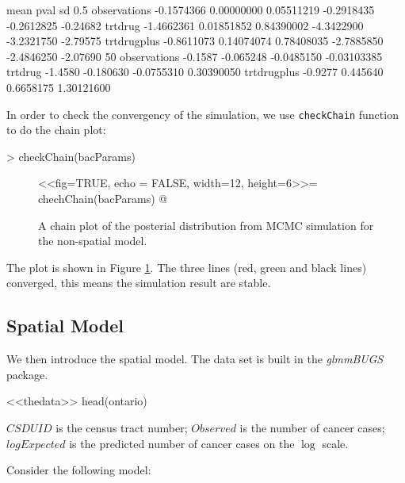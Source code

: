 \documentclass{article}
\begin{document}
\begin{Schunk}
\begin{Soutput}
                   mean       pval         sd       0.5%       2.5%       5%
observations -0.1574366 0.00000000 0.05511219 -0.2918435 -0.2612825 -0.24682
trtdrug      -1.4662361 0.01851852 0.84390002 -4.3422900 -3.2321750 -2.79575
trtdrugplus  -0.8611073 0.14074074 0.78408035 -2.7885850 -2.4846250 -2.07690
                 50%       95%      97.5%       99.5%
observations -0.1587 -0.065248 -0.0485150 -0.03103385
trtdrug      -1.4580 -0.180630 -0.0755310  0.30390050
trtdrugplus  -0.9277  0.445640  0.6658175  1.30121600
\end{Soutput}
\end{Schunk}

In order to check the convergency of the simulation, we use \verb!checkChain! function to do the chain plot:
\begin{Schunk}
\begin{Sinput}
> checkChain(bacParams)
\end{Sinput}
\end{Schunk}

\begin{figure}[ht]
\begin{center}
 <<fig=TRUE, echo = FALSE, width=12, height=6>>=
 chechChain(bacParams)
 @
 \caption{A chain plot of the posterial distribution from MCMC simulation for the non-spatial model.}\label{chain}
 \end{center}
\end{figure}

The plot is shown in Figure \ref{chain}. The three lines (red, green and black lines) converged, this means the simulation result are stable. 



\subsection{Spatial Model} 
We then introduce the spatial model. The data set is built in the \textit{glmmBUGS} package. 

<<thedata>>
head(ontario)

$CSDUID$ is the census tract number; 
$Observed$ is the number of cancer cases; 
$logExpected$ is the predicted number of cancer cases on the $\log$ scale.

Consider the following model:
\end{document}
